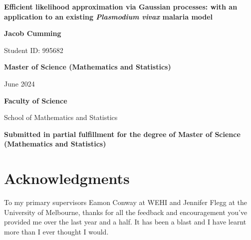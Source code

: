 \documentclass{book}
\begin{document}
\begin{titlepage}
    \centering

    \vspace*{1cm}

    {\Large \textbf{Efficient likelihood approximation via Gaussian processes:
            with an application to an existing \emph{Plasmodium vivax} malaria model}}\par
    \vspace{1.5cm}

    {\large \textbf{Jacob Cumming}}\par
    \vspace{0.5cm}
    
    {\large Student ID: 995682}\par
    \vspace{1.5cm}

    {\large \textbf{Master of Science (Mathematics and Statistics)}}\par
    \vspace{0.5cm}

    {\large June 2024}\par
    \vspace{1.5cm}

    \vspace{1.5cm}

    {\large \textbf{Faculty of Science}}\par
    \vspace{0.5cm}

    {\large School of Mathematics and Statistics}\par
    \vspace{1.5cm}

    \textbf{Submitted in partial fulfillment for the degree of
        Master of Science (Mathematics and Statistics)}\par

    \vfill

\end{titlepage}
\newpage
\chapter*{Acknowledgments}
To my primary supervisors Eamon Conway at WEHI 
and Jennifer Flegg at the University of Melbourne, thanks for all the
feedback and encouragement you've provided me over the last year and a half.
It has been a blast and I have learnt more than I ever thought I would.
\end{document}
